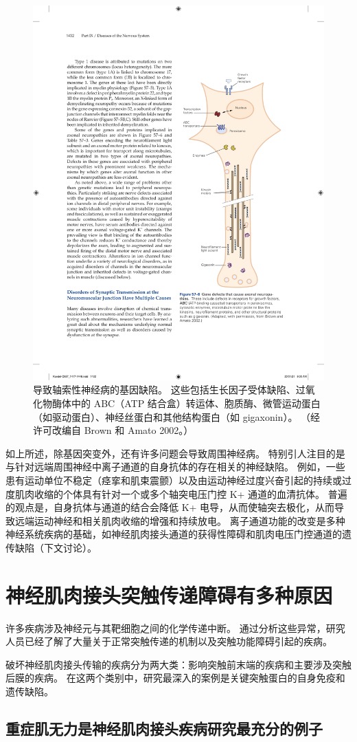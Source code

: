 \begin{figure}[htbp]
	\centering
	\includegraphics[width=0.5\linewidth]{chap57/fig_57_6}
	\caption{导致轴索性神经病的基因缺陷。 这些包括生长因子受体缺陷、过氧化物酶体中的 ABC（ATP 结合盒）转运体、胞质酶、微管运动蛋白（如驱动蛋白）、神经丝蛋白和其他结构蛋白（如 gigaxonin）。 （经许可改编自 Brown 和 Amato 2002。）}
	\label{fig:57_6}
\end{figure}


如上所述，除基因突变外，还有许多问题会导致周围神经病。
特别引人注目的是与针对远端周围神经中离子通道的自身抗体的存在相关的神经缺陷。
例如，一些患有运动单位不稳定（痉挛和肌束震颤）以及由运动神经过度兴奋引起的持续或过度肌肉收缩的个体具有针对一个或多个轴突电压门控 K+ 通道的血清抗体。
普遍的观点是，自身抗体与通道的结合会降低 K+ 电导，从而使轴突去极化，从而导致远端运动神经和相关肌肉收缩的增强和持续放电。
离子通道功能的改变是多种神经系统疾病的基础，如神经肌肉接头通道的获得性障碍和肌肉电压门控通道的遗传缺陷（下文讨论）。



\section{神经肌肉接头突触传递障碍有多种原因}

许多疾病涉及神经元与其靶细胞之间的化学传递中断。
通过分析这些异常，研究人员已经了解了大量关于正常突触传递的机制以及突触功能障碍引起的疾病。


破坏神经肌肉接头传输的疾病分为两大类：影响突触前末端的疾病和主要涉及突触后膜的疾病。
在这两个类别中，研究最深入的案例是关键突触蛋白的自身免疫和遗传缺陷。



\subsection{重症肌无力是神经肌肉接头疾病研究最充分的例子}

